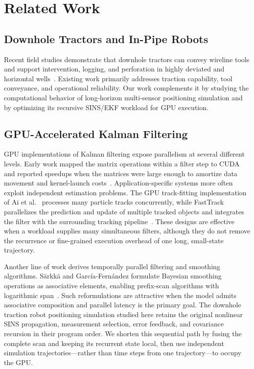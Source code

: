 \documentclass[research]{fcs}
\begin{document}
\section{Related Work}
\label{sec:related-work}

\subsection{Downhole Tractors and In-Pipe Robots}
\label{subsec:related-downhole}

Recent field studies demonstrate that downhole tractors can convey wireline tools and support intervention, logging, and perforation in highly deviated and horizontal wells~\cite{he2020downhole-tractor,chawla2024tractor-glide}. Existing work primarily addresses traction capability, tool conveyance, and operational reliability. Our work complements it by studying the computational behavior of long-horizon multi-sensor positioning simulation and by optimizing its recursive SINS/EKF workload for GPU execution.

\subsection{GPU-Accelerated Kalman Filtering}
\label{subsec:related-kalman}

GPU implementations of Kalman filtering expose parallelism at several different levels. Early work mapped the matrix operations within a filter step to CUDA and reported speedups when the matrices were large enough to amortize data movement and kernel-launch costs~\cite{huang2011gpu-kalman}. Application-specific systems more often exploit independent estimation problems. The GPU track-fitting implementation of Ai et al.~\cite{ai2021gpu-kalman} processes many particle tracks concurrently, while FastTrack parallelizes the prediction and update of multiple tracked objects and integrates the filter with the surrounding tracking pipeline~\cite{liu2024fasttrack}. These designs are effective when a workload supplies many simultaneous filters, although they do not remove the recurrence or fine-grained execution overhead of one long, small-state trajectory.

Another line of work derives temporally parallel filtering and smoothing algorithms. S\"arkk\"a and Garc\'ia-Fern\'andez formulate Bayesian smoothing operations as associative elements, enabling prefix-scan algorithms with logarithmic span~\cite{sarkka2021temporal}. Such reformulations are attractive when the model admits associative composition and parallel latency is the primary goal. The downhole traction robot positioning simulation studied here retains the original nonlinear SINS propagation, measurement selection, error feedback, and covariance recursion in their program order. We shorten this sequential path by fusing the complete scan and keeping its recurrent state local, then use independent simulation trajectories---rather than time steps from one trajectory---to occupy the GPU.
\end{document}
